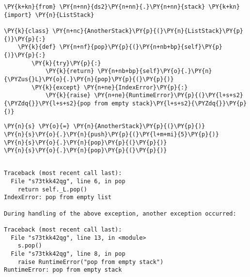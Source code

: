 \begin{Verbatim}[commandchars=\\\{\}]
\PY{k+kn}{from} \PY{n+nn}{ds2}\PY{n+nn}{.}\PY{n+nn}{stack} \PY{k+kn}{import} \PY{n}{ListStack}

\PY{k}{class} \PY{n+nc}{AnotherStack}\PY{p}{(}\PY{n}{ListStack}\PY{p}{)}\PY{p}{:}
    \PY{k}{def} \PY{n+nf}{pop}\PY{p}{(}\PY{n+nb+bp}{self}\PY{p}{)}\PY{p}{:}
        \PY{k}{try}\PY{p}{:}
            \PY{k}{return} \PY{n+nb+bp}{self}\PY{o}{.}\PY{n}{\PYZus{}L}\PY{o}{.}\PY{n}{pop}\PY{p}{(}\PY{p}{)}
        \PY{k}{except} \PY{n+ne}{IndexError}\PY{p}{:}
            \PY{k}{raise} \PY{n+ne}{RuntimeError}\PY{p}{(}\PY{l+s+s2}{\PYZdq{}}\PY{l+s+s2}{pop from empty stack}\PY{l+s+s2}{\PYZdq{}}\PY{p}{)}
\end{Verbatim}



\begin{Verbatim}[commandchars=\\\{\}]
\PY{n}{s} \PY{o}{=} \PY{n}{AnotherStack}\PY{p}{(}\PY{p}{)}
\PY{n}{s}\PY{o}{.}\PY{n}{push}\PY{p}{(}\PY{l+m+mi}{5}\PY{p}{)}
\PY{n}{s}\PY{o}{.}\PY{n}{pop}\PY{p}{(}\PY{p}{)}
\PY{n}{s}\PY{o}{.}\PY{n}{pop}\PY{p}{(}\PY{p}{)}
\end{Verbatim}

\begin{Verbatim}

Traceback (most recent call last):
  File "s73tkk42qg", line 6, in pop
    return self._L.pop()
IndexError: pop from empty list

During handling of the above exception, another exception occurred:

Traceback (most recent call last):
  File "s73tkk42qg", line 13, in <module>
    s.pop()
  File "s73tkk42qg", line 8, in pop
    raise RuntimeError("pop from empty stack")
RuntimeError: pop from empty stack

\end{Verbatim}
